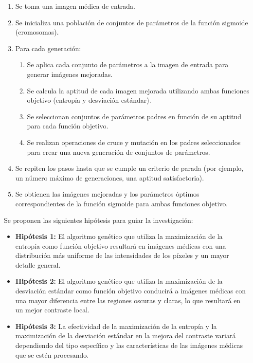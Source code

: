 \begin{enumerate}
\item Se toma una imagen médica de entrada.
\item Se inicializa una población de conjuntos de parámetros de la función sigmoide (cromosomas).
\item Para cada generación:
   \begin{enumerate}
   \item Se aplica cada conjunto de parámetros a la imagen de entrada para generar imágenes mejoradas.
   \item Se calcula la aptitud de cada imagen mejorada utilizando ambas funciones objetivo (entropía y desviación estándar).
   \item Se seleccionan conjuntos de parámetros padres en función de su aptitud para cada función objetivo.
   \item Se realizan operaciones de cruce y mutación en los padres seleccionados para crear una nueva generación de conjuntos de parámetros.
   \end{enumerate}
\item Se repiten los pasos hasta que se cumple un criterio de parada (por ejemplo, un número máximo de generaciones, una aptitud satisfactoria).
\item Se obtienen las imágenes mejoradas y los parámetros óptimos correspondientes de la función sigmoide para ambas funciones objetivo.
\end{enumerate}

Se proponen las siguientes hipótesis para guiar la investigación:

\begin{itemize}
\item \textbf{Hipótesis 1:} El algoritmo genético que utiliza la maximización de la entropía como función objetivo resultará en imágenes médicas con una distribución más uniforme de las intensidades de los píxeles y un mayor detalle general.

\item \textbf{Hipótesis 2:} El algoritmo genético que utiliza la maximización de la desviación estándar como función objetivo conducirá a imágenes médicas con una mayor diferencia entre las regiones oscuras y claras, lo que resultará en un mejor contraste local.

\item \textbf{Hipótesis 3:} La efectividad de la maximización de la entropía y la maximización de la desviación estándar en la mejora del contraste variará dependiendo del tipo específico y las características de las imágenes médicas que se estén procesando.
\end{itemize}


